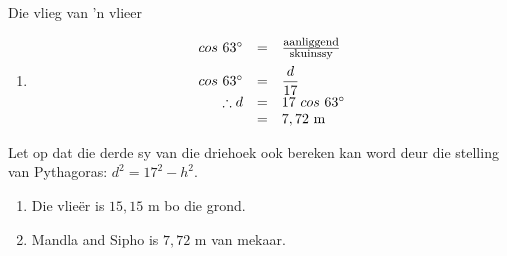 \begin{wex}{Die vlieg van 'n vlieer}
{\begin{enumerate}[noitemsep, label=\textbf{\arabic*}. ]
\item
\begin{equation*}
 \begin{array}{ccl}
\hfill cos~63^{\circ} &= & \frac{\mbox{\footnotesize aanliggend}}{\mbox{\footnotesize skuinssy}} \hfill \vspace{5pt}\\
\hfill cos~63^{\circ} &=& \dfrac{d}{17} \hfill \\
\hfill \therefore d &= & 17~cos ~63^{\circ} \hfill \\
\hfill  &=& 7,72~\mbox{m} \hfill \\
\end{array}
\end{equation*}
\end{enumerate}
Let op dat die derde sy van die driehoek ook bereken kan word deur die stelling van Pythagoras: $d^{2} = 17^{2} - h^{2}$.

\begin{enumerate}[noitemsep, label=\textbf{\arabic*}. ] 
\item Die vlie\"er is $15,15$ m bo die grond.
\item Mandla and Sipho is $7,72$ m van mekaar.
\end{enumerate}
}
 
\end{wex}

